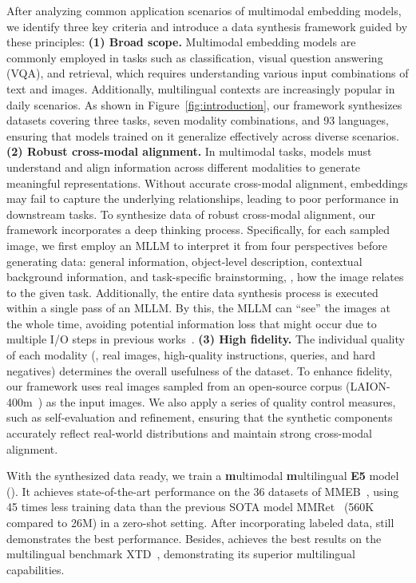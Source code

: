 After analyzing common application scenarios of multimodal embedding models, we identify three key criteria and introduce a data synthesis framework guided by these principles:
\textbf{(1) Broad scope.}
Multimodal embedding models are commonly employed in tasks such as classification, visual question answering (VQA), and retrieval, which requires understanding various input combinations of text and images.
Additionally, multilingual contexts are increasingly popular in daily scenarios.
As shown in Figure~\ref{fig:introduction}, our framework synthesizes datasets covering three tasks, seven modality combinations, and 93 languages, ensuring that models trained on it generalize effectively across diverse scenarios.
\textbf{(2) Robust cross-modal alignment.}
In multimodal tasks, models must understand and align information across different modalities to generate meaningful representations. 
Without accurate cross-modal alignment, embeddings may fail to capture the underlying relationships, leading to poor performance in downstream tasks.
To synthesize data of robust cross-modal alignment, our framework incorporates a deep thinking process. 
Specifically, for each sampled image, we first employ an MLLM to interpret it from four perspectives before generating data: general information, object-level description, contextual background information, and task-specific brainstorming, \ie, how the image relates to the given task. 
Additionally, the entire data synthesis process is executed within a single pass of an MLLM.
By this, the MLLM can ``see'' the images at the whole time, avoiding potential information loss that might occur due to multiple I/O steps in previous works~\cite{megapairs, GME}.
\textbf{(3) High fidelity.}
The individual quality of each modality (\eg, real images, high-quality instructions, queries, and hard negatives) determines the overall usefulness of the dataset. 
To enhance fidelity, our framework uses real images sampled from an open-source corpus (LAION-400m~\cite{LAION}) as the input images.
We also apply a series of quality control measures, such as self-evaluation and refinement, ensuring that the synthetic components accurately reflect real-world distributions and maintain strong cross-modal alignment.

With the synthesized data ready, we train a \textbf{m}ultimodal \textbf{m}ultilingual \textbf{E5} model (\ours{}).
It achieves state-of-the-art performance on the 36 datasets of MMEB~\cite{MMEB}, using 45 times less training data than the previous SOTA model MMRet~\cite{megapairs} (560K compared to 26M) in a zero-shot setting. 
After incorporating labeled data, \ours{} still demonstrates the best performance.
Besides, \ours{} achieves the best results on the multilingual benchmark XTD~\cite{XTD}, demonstrating its superior multilingual capabilities.


